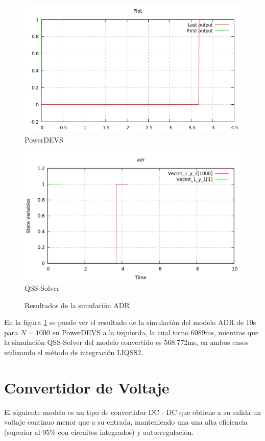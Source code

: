 \begin{figure}[H]
\begin{minipage}{0.5\textwidth}
 \includegraphics[width=\linewidth]{adr-pd}
\centering
PowerDEVS
\end{minipage}\hfill
\begin{minipage}{0.5\textwidth}
 \includegraphics[width=\linewidth]{adr-qss}
\centering
QSS-Solver
\end{minipage}
\label{graph:adr}
\caption{Resultados de la simulación ADR}
\end{figure}

En la figura \ref{graph:adr} se puede ver el resultado de la simulación del modelo ADR de 10s para $N=1000$ en PowerDEVS a la izquierda, la cual tomo 6089ms,
mientras que la simulación QSS-Solver del modelo convertido es 568.772ms, en ambos casos utilizando el método de integración LIQSS2.

\section{Convertidor de Voltaje}
	El siguiente modelo es un tipo de convertidor DC - DC que obtiene a su  salida  un  voltaje  continuo  menor  que  a  su entrada, manteniendo una una  alta eficiencia (superior al 95\% con circuitos integrados) y autorregulación.

